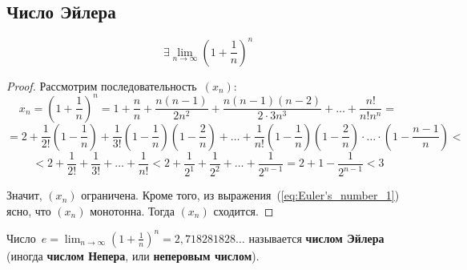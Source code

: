 \subsection{Число Эйлера}
\begin{statement}
\begin{equation*}
\exists \lim_{n \to \infty} \left( 1 + \frac1n \right)^n
\end{equation*}
\end{statement}
\begin{proof}
Рассмотрим последовательность~$(x_n) \colon$
\begin{equation*}
x_n = \left( 1 + \frac1n \right)^n = 1 + \frac{n}n + \frac{n(n - 1)}{2n^2} + \frac{n(n - 1)(n - 2)}{2 \cdot 3n^3} + \ldots + \frac{n!}{n!n^n} =
\end{equation*}
\begin{equation}
\label{eq:Euler's_number_1}
= 2 + \frac1{2!} \left( 1 - \frac1n \right) + \frac1{3!} \left( 1 - \frac1n \right) \left( 1 - \frac2n \right) + \ldots + \frac1{n!} \left( 1 - \frac1n \right) \left( 1 - \frac2n \right) \cdot \ldots \cdot \left( 1 - \frac{n - 1}n \right) <
\end{equation}
\begin{equation*}
< 2 + \frac1{2!} + \frac1{3!} + \ldots + \frac1{n!} < 2 + \frac1{2^1} + \frac1{2^2} + \ldots + \frac1{2^{n-1}} = 2 + 1 - \frac1{2^{n-1}} < 3
\end{equation*}

Значит, $(x_n)$ ограничена.
Кроме того, из выражения~(\ref*{eq:Euler's_number_1}) ясно, что $(x_n)$ монотонна.
Тогда $(x_n)$ сходится.
\end{proof}

  Число~$\displaystyle e = \lim_{n \to \infty} \left( 1 + \frac1n \right)^n = 2{,}718281828\ldots$ называется \textbf{числом Эйлера} (иногда \textbf{числом Непера}, или \textbf{неперовым числом}).